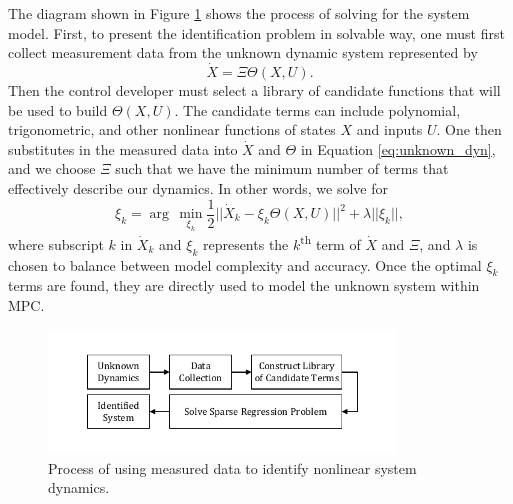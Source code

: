 \documentclass[letterpaper, preprint, paper,11pt]{AAS}	%
\begin{document}
The diagram shown in Figure \ref{fig:SINCYC} shows the process of solving for the system model. First, to present the identification problem in solvable way, one must first collect measurement data from the unknown dynamic system represented by
\begin{equation}
\label{eq:unknown_dyn}
\dot{X} = \Xi\Theta(X,U).
\end{equation}
Then the control developer must select a library of candidate functions that will be used to build $\Theta(X,U)$. The candidate terms can include polynomial, trigonometric, and other nonlinear functions of states $X$ and inputs $U$. One then substitutes in the measured data into $\dot{X}$ and $\Theta$ in Equation \eqref{eq:unknown_dyn}, and we choose $\Xi$ such that we have the minimum number of terms that effectively describe our dynamics. In other words, we solve for  
\begin{equation}
\label{eq:sparse_reg}
\xi_k = \arg\,\min\limits_{\xi_k}\frac{1}{2}||\dot{X}_k-\xi_k\Theta(X,U)||^2+\lambda||\xi_k||, 
\end{equation}
where subscript $k$ in $\dot{X}_k$ and $\xi_k$ represents the $k$\textsuperscript{th} term of $\dot{X}$ and $\Xi$, and $\lambda$ is chosen to balance between model complexity and accuracy. Once the optimal $\xi_k$ terms are found, they are  directly used to model the unknown system within MPC.

\begin{figure}[h!]
	\centering\includegraphics[width=3.64in]{Figures/SINDYC.pdf}
	\caption{Process of using measured data to identify nonlinear system dynamics.}
	\label{fig:SINCYC}
\end{figure}

\end{document}
